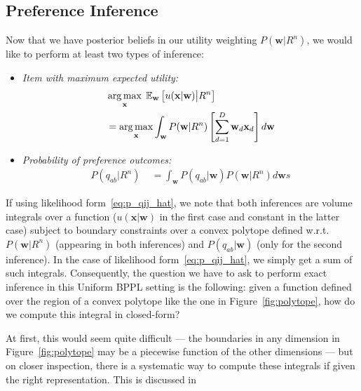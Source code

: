 \documentclass[letterpaper]{article}
\newcommand{\E}{\mathbb{E}}
\renewcommand{\vec}[1]{\mathbf{#1}}
\def\argmax{\operatornamewithlimits{arg\,max}}
\begin{document}
\subsection{Preference Inference}

\label{sec:bppl_inference}


Now that we have posterior beliefs in our utility weighting 
$P(\vec{w}|R^n)$, we would like to perform at least two types of inference:
\begin{itemize}
\item {\it Item with maximum expected utility:} 
\begin{align}
\label{eq:maxEU}
& \argmax_{\vec{x}} \; \E_{\vec{w}} \left[ u(\vec{x}|\vec{w}) \big| R^n \right]\\ & = \argmax_{\vec{x}} \int_{\vec{w}} P(\vec{w}|R^n) \left[ \sum_{d=1}^{D} \vec{w}_d \vec{x}_d \right] d\vec{w}
\end{align}
\item {\it Probability of preference outcomes:} 
\begin{align*}
P(q_{ab} | R^n) \; & = \int_\vec{w} P(q_{ab} | \vec{w}) P(\vec{w}|R^n) d\vec{w}s
\end{align*}
\end{itemize}
If using likelihood form~\eqref{eq:p_qij_hat}, we note that both
inferences are volume integrals over a function ($u(\vec{x}|\vec{w})$
in the first case and constant in the latter case) subject to boundary
constraints over a convex polytope defined w.r.t.\ $P(\vec{w}|R^n)$
(appearing in both inferences) and $P(q_{ab} | \vec{w})$ (only for the
second inference).  In the case of likelihood
form~\eqref{eq:p_qij_hat}, we simply get a sum of such integrals.
Consequently, the question we have to ask to perform exact inference
in this Uniform BPPL setting is the following: given a function
defined over the region of a convex polytope like the one in
Figure~\ref{fig:polytope}, how do we compute this integral in
closed-form?

At first, this would seem quite difficult --- the boundaries in any
dimension in Figure~\ref{fig:polytope} may be a piecewise function of
the other dimensions --- but on closer inspection, there is a
systematic way to compute these integrals if given the right
representation.  This is discussed in \cite{sve11}
\end{document}
